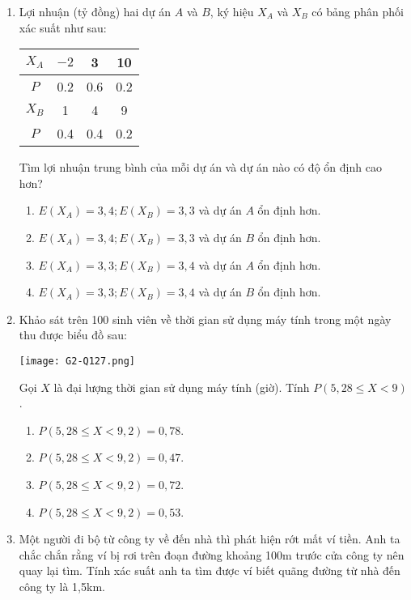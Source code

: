 \begin{enumerate}[label=\textbf{Câu \arabic*.},align=left,left=0cm..0cm,itemindent=*]
\begin{enumerate}[label=\textbf{\Alph*.},align=left,left=1cm..0cm,itemindent=*]
	\end{enumerate}
	\item Lợi nhuận (tỷ đồng) hai dự án $A$ và $B$, ký hiệu $X_A$ và $X_B$ có bảng phân phối xác suất như sau:
	\begin{longtable}{|c|c|c|c|}\hline
	$X_A$ & $-2$ & 3   & 10  \\ \hline
	$P$   & 0.2  & 0.6 & 0.2 \\ \hline\hline
	$X_B$ & 1 	& 4   & 9   \\ \hline
	$P$   & 0.4  & 0.4 & 0.2 \\ \hline
	\end{longtable}
	Tìm lợi nhuận trung bình của mỗi dự án và dự án nào có độ ổn định cao hơn?
	\begin{enumerate}[label=\textbf{\Alph*.},align=left,left=1cm..0cm,itemindent=*]
		\item $E\left( {{X}_{A}} \right)=3,4; E\left( {{X}_{B}} \right)=3,3$ và dự án $A$ ổn định hơn.
		\item $E\left( {{X}_{A}} \right)=3,4; E\left( {{X}_{B}} \right)=3,3$ và dự án $B$ ổn định hơn.
		\item $E\left( {{X}_{A}} \right)=3,3; E\left( {{X}_{B}} \right)=3,4$ và dự án $A$ ổn định hơn.
		\item $E\left( {{X}_{A}} \right)=3,3; E\left( {{X}_{B}} \right)=3,4$ và dự án $B$ ổn định hơn.
	\end{enumerate}
	\item Khảo sát trên 100 sinh viên về thời gian sử dụng máy tính trong một ngày thu được biểu đồ sau:\par
	{\centering\texttt{[image: G2-Q127.png]}\par}
	Gọi $X$ là đại lượng thời gian sử dụng máy tính (giờ). Tính $P\left( 5,28\leqslant X<9 \right)$.
	\begin{enumerate}[label=\textbf{\Alph*.},align=left,left=1cm..0cm,itemindent=*]
		\item $P\left( 5,28\leqslant X<9,2 \right)=0,78$.
		\item $P\left( 5,28\leqslant X<9,2 \right)=0,47$.
		\item $P\left( 5,28\leqslant X<9,2 \right)=0,72$.
		\item $P\left( 5,28\leqslant X<9,2 \right)=0,53$.
	\end{enumerate}
	\item Một người đi bộ từ công ty về đến nhà thì phát hiện rớt mất ví tiền. Anh ta chắc chắn rằng ví bị rơi trên đoạn đường khoảng 100m trước cửa công ty nên quay lại tìm. Tính xác suất anh ta tìm được ví biết quãng đường từ nhà đến công ty là 1,5km.

\end{enumerate}
